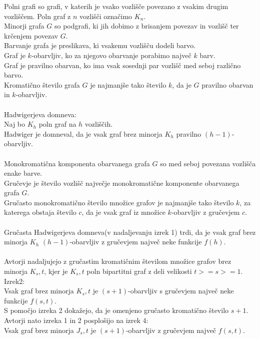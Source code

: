 \documentclass{article}
\begin{document}
Polni grafi so grafi, v katerih je vsako vozlišče povezano z vsakim drugim vozliščem. Poln graf z $n$ vozlišči označimo $K_n$.\\                                                           
Minorji grafa $G$ so podgrafi, ki jih dobimo z brisanjem povezav in vozlišč ter krčenjem povezav $G$.\\
Barvanje grafa je preslikava, ki vsakemu vozlišču dodeli barvo.\\
Graf je $k$-obarvljiv, ko za njegovo obarvanje porabimo največ $k$ barv.\\
Graf je pravilno obarvan, ko ima vsak sosednji par vozlišč med seboj različno barvo.\\
Kromatično število grafa $G$ je najmanjše tako število $k$, da je $G$ pravilno obarvan in $k$-obarvljiv.\\
\\
Hadwigerjeva domneva:\\
Naj bo $K_h$ poln graf na $h$ vozliščih.\\
Hadwiger je domneval, da je vsak graf brez minorja $K_h$ pravilno $(h - 1)$-obarvljiv.\\
\\
Monokromatična komponenta obarvanega grafa $G$ so med seboj povezana vozlišča enake barve.\\
Gručevje je število vozlišč največje monokromatične komponente obarvanega grafa $G$.\\
Gručasto monokromatično število množice grafov je najmanjše tako število $k$, za katerega obstaja število $c$, da je vsak graf iz množice $k$-obarvljiv z gručevjem $c$.\\
\\
Gručasta Hadwigerjeva domneva(v nadaljevanju izrek 1) trdi, da je vsak graf brez minorja $K_h$ $(h - 1)$-obarvljiv z gručevjem največ neke funkcije $f(h)$.\\
\\
Avtorji nadaljujejo z gručastim kromatičnim številom množice grafov brez minorja $K_s,t$, kjer je $K_s,t$ poln bipartitni graf z deli velikosti $t>=s>=1$.\\
Izrek2:\\
Vsak graf brez minorja $K_s,t$ je $(s+1)$-obarvljiv s gručevjem največ neke funkcije $f(s,t)$.\\
S pomočjo izreka 2 dokažejo, da je omenjeno gručasto kromatično število $s+1$.\\

Avtorji nato izreka 1 in 2 posplošijo na izrek 4:\\
Vsak graf brez minorja $J_s,t$ je $(s+1)$-obarvljiv z gručevjem največ $f(s, t)$.\\
\end{document}
